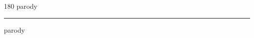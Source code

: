 
\begin{frame}
\begin{center}
\begin{turn}{180}
{\fontsize{2.5cm}{1em}\selectfont parody}
\end{turn}
\vspace{1em}\par  
\hrule
\vspace{1em}\par  
{\fontsize{2.5cm}{1em}\selectfont parody}
\end{center}
\end{frame}
